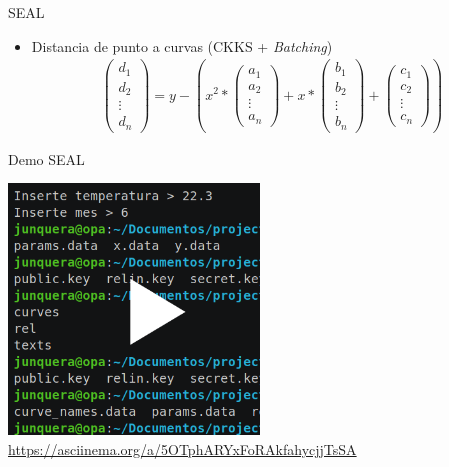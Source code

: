 \documentclass{beamer}
\begin{document}
\begin{frame}{SEAL}
    \begin{itemize}
        \item Distancia de punto a curvas (CKKS + \textit{Batching})
        \begin{align*}
        \begin{pmatrix}
            d_1 \\
            d_2 \\
            \vdots{} \\
            d_n
        \end{pmatrix}
        =
        y - (x^2 *
        \begin{pmatrix}
            a_1 \\
            a_2 \\
            \vdots{} \\
            a_n
        \end{pmatrix}
        + x *
        \begin{pmatrix}
            b_1 \\
            b_2 \\
            \vdots{} \\
            b_n
        \end{pmatrix}
        +
        \begin{pmatrix}
            c_1 \\
            c_2 \\
            \vdots{} \\
            c_n
        \end{pmatrix}
        )
        \label{form:distancias_seal}
    \end{align*}
    \end{itemize}{}
\end{frame}

\begin{frame}{Demo SEAL}

    \href{https://asciinema.org/a/5OTphARYxFoRAkfahycjjTsSA}{
        \centering\includegraphics[width=0.5\textwidth]{seal-cs}
    }
    \centering\url{https://asciinema.org/a/5OTphARYxFoRAkfahycjjTsSA}

\end{frame}
\end{document}
